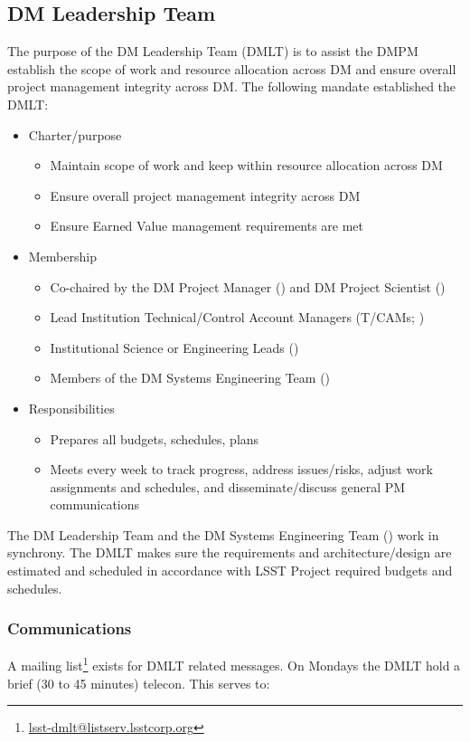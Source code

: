 \subsection{DM Leadership Team \label{sect:dmlt}}

The purpose of the DM Leadership Team (DMLT) is to assist the DMPM  establish the scope of work and resource allocation across DM and ensure overall project management integrity across DM.
The following mandate established the DMLT:

\begin{itemize}
\item Charter/purpose
	\begin{itemize}
	\item Maintain scope of work and keep within resource allocation across DM
	\item Ensure overall project management integrity across DM
	\item Ensure Earned Value management requirements are met
	\end{itemize}
\item Membership
	\begin{itemize}
	\item Co-chaired by the DM Project Manager () and DM Project Scientist ()
	\item Lead Institution Technical/Control Account Managers (T/CAMs; )
	\item Institutional Science or Engineering Leads ()
	\item Members of the DM Systems Engineering Team ()
	\end{itemize}
\item Responsibilities
	\begin{itemize}
	\item Prepares all budgets, schedules, plans
	\item Meets every week to track progress, address issues/risks, adjust work assignments and schedules, and disseminate/discuss general PM communications
	\end{itemize}
\end{itemize}

The DM Leadership Team and the DM Systems Engineering Team () work in synchrony.
The DMLT makes sure the requirements and architecture/design are estimated and scheduled in accordance with LSST Project required budgets and schedules.

 \subsubsection{Communications}
A mailing list\footnote{\url{lsst-dmlt@listserv.lsstcorp.org}} exists for DMLT related messages.
On Mondays the DMLT hold a brief (30 to 45 minutes) telecon. This serves to:

